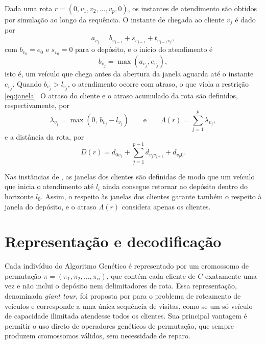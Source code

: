 Dada uma rota $r = (0, v_1, v_2, \dots, v_p, 0)$, os instantes de atendimento são
obtidos por simulação ao longo da sequência. O instante de chegada ao cliente $v_j$ é
dado por
\begin{equation}
	a_{v_j} = b_{v_{j-1}} + s_{v_{j-1}} + t_{v_{j-1} v_j},
	\label{eq:chegada}
\end{equation}
com $b_{v_0} = e_0$ e $s_{v_0} = 0$ para o depósito, e o início do atendimento é
\begin{equation}
	b_{v_j} = \max\left(a_{v_j}, e_{v_j}\right),
	\label{eq:inicio}
\end{equation}
isto é, um veículo que chega antes da abertura da janela aguarda até o instante
$e_{v_j}$. Quando $b_{v_j} > l_{v_j}$, o atendimento ocorre com atraso, o que viola a
restrição \eqref{eq:janela}. O atraso do cliente e o atraso acumulado da rota são
definidos, respectivamente, por
\begin{equation}
	\lambda_{v_j} = \max\left(0, \, b_{v_j} - l_{v_j}\right)
	\qquad \text{e} \qquad
	\Lambda(r) = \sum_{j=1}^{p} \lambda_{v_j},
	\label{eq:atraso}
\end{equation}
e a distância da rota, por
\begin{equation}
	D(r) = d_{0 v_1} + \sum_{j=1}^{p-1} d_{v_j v_{j+1}} + d_{v_p 0}.
	\label{eq:distancia}
\end{equation}

Nas instâncias de , as janelas dos clientes são definidas de modo
que um veículo que inicia o atendimento até $l_i$ ainda consegue retornar ao depósito
dentro do horizonte $l_0$. Assim, o respeito às janelas dos clientes garante também o
respeito à janela do depósito, e o atraso $\Lambda(r)$ considera apenas os clientes.

\section{Representação e decodificação}
\label{sec:representacao}

Cada indivíduo do Algoritmo Genético é representado por um cromossomo de permutação
$\pi = (\pi_1, \pi_2, \dots, \pi_n)$, que contém cada cliente de $C$ exatamente uma vez
e não inclui o depósito nem delimitadores de rota. Essa representação, denominada
\textit{giant tour}, foi proposta por  para o problema de
roteamento de veículos e corresponde a uma única sequência de visitas, como se um só
veículo de capacidade ilimitada atendesse todos os clientes. Sua principal vantagem é
permitir o uso direto de operadores genéticos de permutação, que sempre produzem
cromossomos válidos, sem necessidade de reparo.

